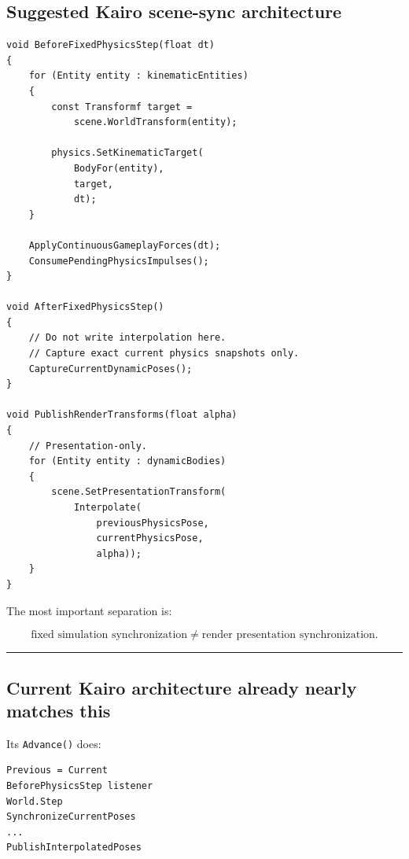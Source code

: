 \subsection{Suggested Kairo scene-sync architecture}\label{06-engine-ii-ch038-suggested-kairo-scene-sync-architecture}

\hypertarget{06-engine-ii-ch038-suggested-kairo-scene-sync-architecture}{}

\begin{verbatim}
void BeforeFixedPhysicsStep(float dt)
{
    for (Entity entity : kinematicEntities)
    {
        const Transformf target =
            scene.WorldTransform(entity);

        physics.SetKinematicTarget(
            BodyFor(entity),
            target,
            dt);
    }

    ApplyContinuousGameplayForces(dt);
    ConsumePendingPhysicsImpulses();
}

void AfterFixedPhysicsStep()
{
    // Do not write interpolation here.
    // Capture exact current physics snapshots only.
    CaptureCurrentDynamicPoses();
}

void PublishRenderTransforms(float alpha)
{
    // Presentation-only.
    for (Entity entity : dynamicBodies)
    {
        scene.SetPresentationTransform(
            Interpolate(
                previousPhysicsPose,
                currentPhysicsPose,
                alpha));
    }
}
\end{verbatim}

The most important separation is:

\[
\boxed{
\text{fixed simulation synchronization}
\neq
\text{render presentation synchronization}.
}
\]

\begin{center}\rule{0.5\linewidth}{0.5pt}\end{center}

\subsection{Current Kairo architecture already nearly matches this}\label{06-engine-ii-ch038-current-kairo-architecture-already-nearly-matches-this}

\hypertarget{06-engine-ii-ch038-current-kairo-architecture-already-nearly-matches-this}{}

Its \texttt{Advance()} does:

\begin{verbatim}
Previous = Current
BeforePhysicsStep listener
World.Step
SynchronizeCurrentPoses
...
PublishInterpolatedPoses
\end{verbatim}

